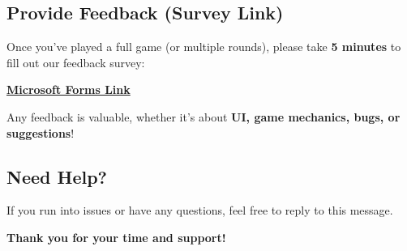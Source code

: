 \documentclass{article}
\begin{document}
\subsection{Provide Feedback (Survey Link)}

Once you’ve played a full game (or multiple rounds), please take \textbf{5 minutes} to fill out our feedback survey:

\href{https://forms.office.com/r/87fhfHWjjW}{\textbf{Microsoft Forms Link}}

Any feedback is valuable, whether it's about \textbf{UI, game mechanics, bugs, or suggestions}!

\subsection{Need Help?}
If you run into issues or have any questions, feel free to reply to this message.

\bigskip

\centering
\textbf{Thank you for your time and support!}
\end{document}
